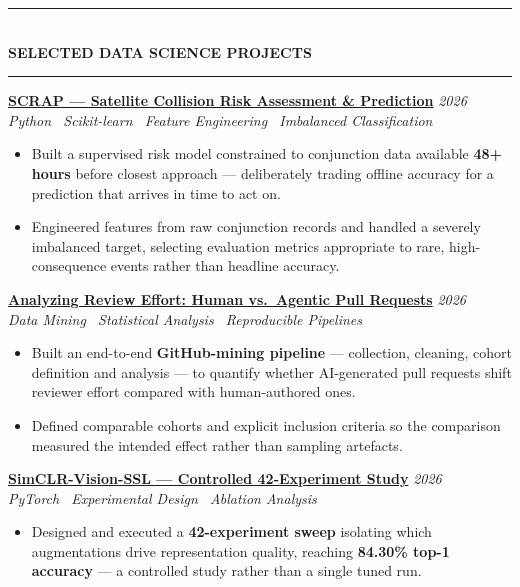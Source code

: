\documentclass[10pt, a4paper]{article}
\newcommand{\cvsection}[1]{%
  \vspace{3pt}%
  {\color{navy}\rule{\linewidth}{1.1pt}}\\[0.5pt]%
  {\color{navy}\bfseries\fontsize{9.5}{11}\selectfont\uppercase{#1}}\\[-4pt]%
  {\color{teal}\rule{\linewidth}{0.6pt}}%
  \vspace{2pt}%
}
\newcommand{\cvproject}[3]{%
  \vspace{2.5pt}%
  {\bfseries\color{navy}#1} \hfill {\color{midgray}\textit{#3}}\\[-1.5pt]%
  {\color{teal}\textit{#2}}%
}
\newenvironment{cvitems}{%
  \begin{itemize}[leftmargin=11pt, itemsep=0.5pt, parsep=0pt, topsep=1pt,
                  label={\textcolor{teal}{$\bullet$}}]
}{%
  \end{itemize}%
}
\begin{document}
\cvsection{Selected Data Science Projects}

\cvproject{\href{https://github.com/MahmoudAlyosify/SCRAP-Satellite-Collision-Risk-Assessment-and-Prediction}{SCRAP --- Satellite Collision Risk Assessment \& Prediction}}
          {Python \textperiodcentered\ Scikit-learn \textperiodcentered\ Feature Engineering \textperiodcentered\ Imbalanced Classification}
          {2026}
\begin{cvitems}
  \item Built a supervised risk model constrained to conjunction data available \textbf{48+ hours} before closest approach --- deliberately trading offline accuracy for a prediction that arrives in time to act on.
  \item Engineered features from raw conjunction records and handled a severely imbalanced target, selecting evaluation metrics appropriate to rare, high-consequence events rather than headline accuracy.
\end{cvitems}

\cvproject{\href{https://github.com/MahmoudAlyosify/Analyzing-Review-Effort-in-Human-vs.-Agentic-Pull-Requests}{Analyzing Review Effort: Human vs.\ Agentic Pull Requests}}
          {Data Mining \textperiodcentered\ Statistical Analysis \textperiodcentered\ Reproducible Pipelines}
          {2026}
\begin{cvitems}
  \item Built an end-to-end \textbf{GitHub-mining pipeline} --- collection, cleaning, cohort definition and analysis --- to quantify whether AI-generated pull requests shift reviewer effort compared with human-authored ones.
  \item Defined comparable cohorts and explicit inclusion criteria so the comparison measured the intended effect rather than sampling artefacts.
\end{cvitems}

\cvproject{\href{https://github.com/MahmoudAlyosify/SimCLR-Vision-SSL}{SimCLR-Vision-SSL --- Controlled 42-Experiment Study}}
          {PyTorch \textperiodcentered\ Experimental Design \textperiodcentered\ Ablation Analysis}
          {2026}
\begin{cvitems}
  \item Designed and executed a \textbf{42-experiment sweep} isolating which augmentations drive representation quality, reaching \textbf{84.30\% top-1 accuracy} --- a controlled study rather than a single tuned run.
\end{cvitems}
\end{document}
